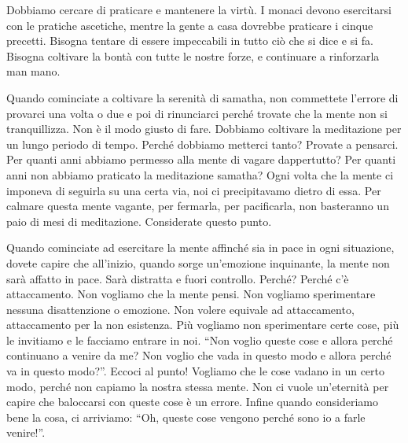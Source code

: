 Dobbiamo cercare di praticare e mantenere la virtù. I monaci devono
esercitarsi con le pratiche ascetiche,%
mentre la
gente a casa dovrebbe praticare i cinque precetti.%
Bisogna tentare di essere impeccabili in tutto ciò che si dice e si fa.
Bisogna coltivare la bontà con tutte le nostre forze, e continuare a
rinforzarla man mano.

Quando cominciate a coltivare la serenità di samatha, non commettete
l'errore di provarci una volta o due e poi di rinunciarci perché trovate
che la mente non si tranquillizza. Non è il modo giusto di fare.
Dobbiamo coltivare la meditazione per un lungo periodo di tempo. Perché
dobbiamo metterci tanto? Provate a pensarci. Per quanti anni abbiamo
permesso alla mente di vagare dappertutto? Per quanti anni non abbiamo
praticato la meditazione samatha? Ogni volta che la mente ci imponeva di
seguirla su una certa via, noi ci precipitavamo dietro di essa. Per
calmare questa mente vagante, per fermarla, per pacificarla, non
basteranno un paio di mesi di meditazione. Considerate questo punto.

Quando cominciate ad esercitare la mente affinché sia in pace in ogni
situazione, dovete capire che all'inizio, quando sorge un'emozione
inquinante, la mente non sarà affatto in pace. Sarà distratta e fuori
controllo. Perché? Perché c'è attaccamento. Non vogliamo che la mente
pensi. Non vogliamo sperimentare nessuna disattenzione o emozione. Non
volere equivale ad attaccamento, attaccamento per la non esistenza. Più
vogliamo non sperimentare certe cose, più le invitiamo e le facciamo
entrare in noi. ``Non voglio queste cose e allora perché continuano a
venire da me? Non voglio che vada in questo modo e allora perché va in
questo modo?''. Eccoci al punto! Vogliamo che le cose vadano in un certo
modo, perché non capiamo la nostra stessa mente. Non ci vuole
un'eternità per capire che baloccarsi con queste cose è un errore.
Infine quando consideriamo bene la cosa, ci arriviamo: ``Oh, queste cose
vengono perché sono io a farle venire!''.

